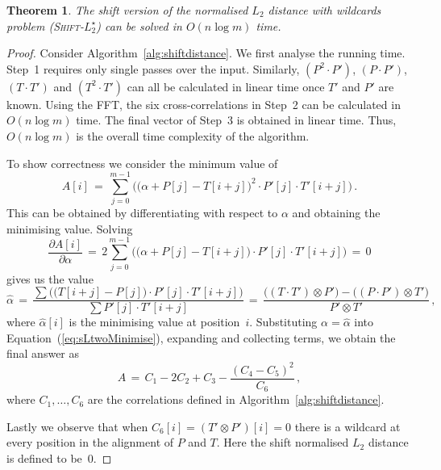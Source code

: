 \documentclass[11pt]{article}
\newcommand{\wildcard}{\ensuremath{\star}\xspace}
\newcommand{\sLtwoWild}{\textsc{Shift-$L_2^\wildcard$}\xspace}
\theoremstyle{plain}
\newtheorem{theorem}{Theorem}[]
\theoremstyle{definition}
\begin{document}
\begin{theorem}
    \label{thm:sLtwoWild}
    The shift version of the normalised $L_2$ distance with wildcards problem (\sLtwoWild) can be solved in $O(n\log{m})$ time.\end{theorem}
\begin{proof}
    Consider Algorithm~\ref{alg:shiftdistance}. We first analyse the running time. Step~1 requires only single passes over the input. Similarly, $(P^2 \cdot P')$, $(P \cdot P')$, $(T \cdot T')$ and $(T^2 \cdot T')$ can all be calculated in linear time once $T'$ and $P'$ are known. Using the FFT, the six cross-correlations in Step~2 can be calculated in $O(n\log{m})$ time. The final vector of Step~3 is obtained in linear time. Thus, $O(n\log{m})$ is the overall time complexity of the algorithm.

    To show correctness we consider the minimum value of
\begin{equation}
        \label{eq:sLtwoMinimise}
        A[i] \,=\, \sum_{j=0}^{m-1} \Big( \big(\alpha + P[j] - T[i+j]\big)^2 \cdot P'[j]\cdot T'[i+j] \Big) \,.
    \end{equation}
This can be obtained by differentiating with respect to $\alpha$ and obtaining the minimising value. Solving
\begin{equation*}
        \frac{\partial A[i]}{\partial \alpha} \,=\, 2 \sum_{j=0}^{m-1} \Big( \big(\alpha + P[j] - T[i+j] \big) \cdot P'[j] \cdot T'[i+j] \Big) \,=\, 0
    \end{equation*}
gives us the value
\begin{equation*}
        \widehat{\alpha} \,=\, \frac{\sum \Big( \big( T[i+j] - P[j] \big) \cdot P'[j] \cdot T'[i+j] \Big)}{\sum P'[j]\cdot T'[i+j]} \,=\, \frac{\big((T \cdot T') \otimes P'\big) - \big((P \cdot P') \otimes T' \big)}{P'\otimes T'} \,,
    \end{equation*}
where $\widehat{\alpha}[i]$ is the minimising value at position~$i$. Substituting $\alpha = \widehat{\alpha}$ into Equation~(\ref{eq:sLtwoMinimise}), expanding and collecting terms, we obtain the final answer as
\begin{equation*}
        A \,=\, C_1 - 2 C_2 + C_3 - \frac{(C_4 - C_5)^2}{C_6} \,,
    \end{equation*}
where $C_1,\dots,C_6$ are the correlations defined in Algorithm~\ref{alg:shiftdistance}.

    Lastly we observe that when $C_6[i]=(T'\otimes P')[i]=0$ there is a wildcard at every position in the alignment of $P$ and $T$. Here the shift normalised $L_2$ distance is defined to be~0.
\end{proof}
\end{document}
